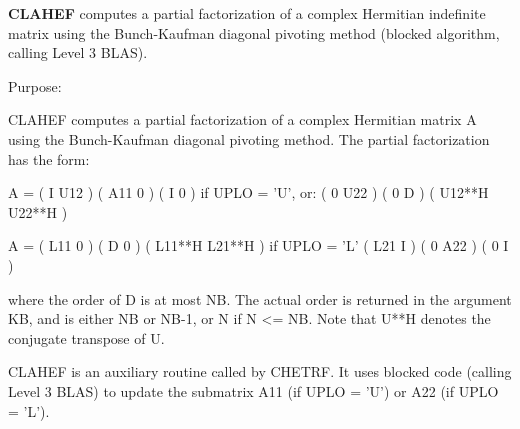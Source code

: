 {\bfseries C\+L\+A\+H\+E\+F} computes a partial factorization of a complex Hermitian indefinite matrix using the Bunch-\/\+Kaufman diagonal pivoting method (blocked algorithm, calling Level 3 B\+L\+A\+S). 

 \begin{DoxyParagraph}{Purpose\+: }
\begin{DoxyVerb} CLAHEF computes a partial factorization of a complex Hermitian
 matrix A using the Bunch-Kaufman diagonal pivoting method. The
 partial factorization has the form:

 A  =  ( I  U12 ) ( A11  0  ) (  I      0     )  if UPLO = 'U', or:
       ( 0  U22 ) (  0   D  ) ( U12**H U22**H )

 A  =  ( L11  0 ) (  D   0  ) ( L11**H L21**H )  if UPLO = 'L'
       ( L21  I ) (  0  A22 ) (  0      I     )

 where the order of D is at most NB. The actual order is returned in
 the argument KB, and is either NB or NB-1, or N if N <= NB.
 Note that U**H denotes the conjugate transpose of U.

 CLAHEF is an auxiliary routine called by CHETRF. It uses blocked code
 (calling Level 3 BLAS) to update the submatrix A11 (if UPLO = 'U') or
 A22 (if UPLO = 'L').\end{DoxyVerb}
 
\end{DoxyParagraph}

